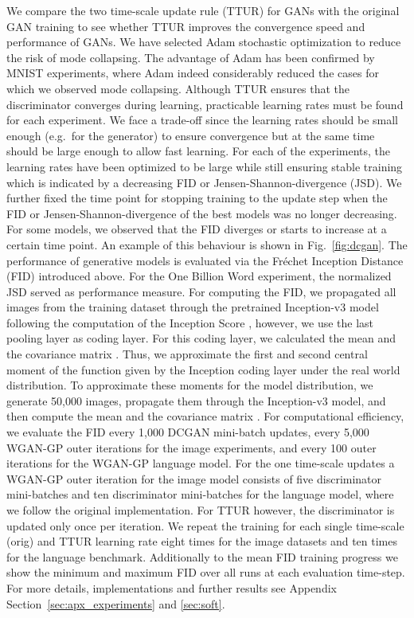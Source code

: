\documentclass{article}
\begin{document}
We compare the two time-scale update rule (TTUR) for GANs with the original GAN
training to see whether TTUR improves the convergence speed and performance of
GANs. We have selected Adam stochastic optimization to reduce the risk of mode
collapsing. The advantage of Adam has been confirmed by MNIST experiments, where
Adam indeed considerably reduced the cases for which we observed mode
collapsing. Although TTUR ensures that the discriminator converges during
learning, practicable learning rates must be found for each experiment.
We face a trade-off since the learning rates should be small enough (e.g.\ for
the generator) to ensure convergence but at the same time should be large enough
to allow fast learning. For each of the experiments, the learning rates have
been optimized to be large while still ensuring stable training which is
indicated by a decreasing FID or Jensen-Shannon-divergence (JSD). We further
fixed the time point for stopping training to the update step when the FID or
Jensen-Shannon-divergence of the best models was no longer decreasing. For some
models, we observed that the FID diverges or starts to increase at a certain
time point. An example of this behaviour is shown in Fig.~\ref{fig:dcgan}. The
performance of generative models is evaluated via the Fr\'{e}chet Inception
Distance (FID) introduced above.
For the One Billion Word experiment, the normalized JSD served as performance
measure. For computing the FID, we propagated all images from the training
dataset through the pretrained Inception-v3 model following the computation of
the Inception Score \cite{Salimans:16}, however, we use the last pooling layer
as coding layer. For this coding layer, we calculated the mean  and the
covariance matrix . Thus, we approximate the first and second central
moment of the function given by the Inception coding layer under the real world
distribution. To approximate these moments for the model distribution, we
generate 50,000 images, propagate them through the Inception-v3 model, and
then compute the mean  and the covariance matrix .
For computational efficiency, we evaluate the FID every 1,000 DCGAN mini-batch
updates, every 5,000 WGAN-GP outer iterations for the image experiments, and
every 100 outer iterations for the WGAN-GP language model. For the one
time-scale updates a WGAN-GP outer iteration for the image model consists of five
discriminator mini-batches and ten discriminator mini-batches for the language
model, where we follow the original implementation. For TTUR however, the
discriminator is updated only once per iteration. We repeat the training for each single time-scale
(orig) and TTUR learning rate eight times for the image datasets and ten times for the language benchmark.
Additionally to the mean FID training progress we show the minimum and maximum
FID over all runs at each evaluation time-step. For more details,
implementations and further results see Appendix
Section~\ref{sec:apx_experiments} and \ref{sec:soft}.
\end{document}
